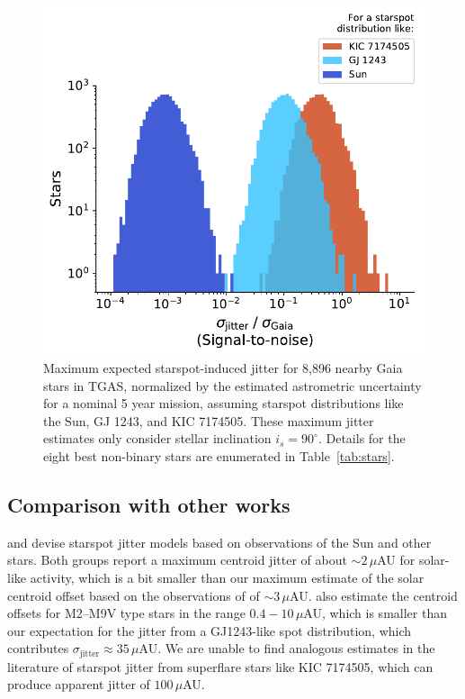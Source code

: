 \begin{figure}
\begin{center}
\includegraphics[scale=0.6]{gaia/summary.pdf}
\end{center}
\caption{Maximum expected starspot-induced jitter for 8,896 nearby Gaia stars in TGAS, normalized by the estimated astrometric uncertainty for a nominal 5 year mission, assuming starspot distributions like the Sun, GJ 1243, and KIC 7174505. These maximum jitter estimates only consider stellar inclination $i_s = 90^\circ$. Details for the eight best non-binary stars are enumerated in Table~\ref{tab:stars}.} \label{fig:jitter}
\end{figure}

\subsection{Comparison with other works}

\citet{Eriksson2007} and \citet{Catanzarite2008} devise starspot jitter models based on observations of the Sun and other stars. Both groups report a maximum centroid jitter of about $\sim 2 \,\mu$AU for solar-like activity, which is a bit smaller than our maximum estimate of the solar centroid offset based on the observations of \citet{Howard1984} of $\sim 3 \,\mu$AU. \citet{Eriksson2007} also estimate the centroid offsets for M2--M9V type stars in the range $0.4-10 \,\mu$AU, which is smaller than our expectation for the jitter from a GJ1243-like spot distribution, which contributes $\sigma_{\mathrm{jitter}} \approx 35\, \mu$AU. We are unable to find analogous estimates in the literature of starspot jitter from superflare stars like KIC 7174505, which can produce apparent jitter of $100\,\mu$AU.


